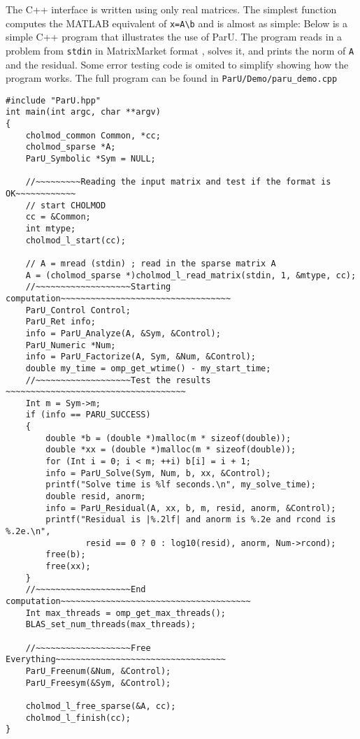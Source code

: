 \documentclass[12pt]{article}
\begin{document}
The C++ interface is written using only real matrices.  
The simplest function computes the MATLAB equivalent of
\verb'x=A\b' and is almost as simple:
Below is a simple C++ program that illustrates the use of ParU.  The
program reads in a problem from \verb'stdin' in MatrixMarket
format \cite{BoisvertPozoRemingtonBarrettDongarra97}, solves it, and prints the
norm of \verb'A' and the residual. 
Some error testing code is omited to simplify showing how the program works. 
The full program can be found in 
\verb'ParU/Demo/paru_demo.cpp'
\begin{verbatim}
#include "ParU.hpp"
int main(int argc, char **argv)
{
    cholmod_common Common, *cc;
    cholmod_sparse *A;
    ParU_Symbolic *Sym = NULL;

    //~~~~~~~~~Reading the input matrix and test if the format is OK~~~~~~~~~~~~
    // start CHOLMOD
    cc = &Common;
    int mtype;
    cholmod_l_start(cc);

    // A = mread (stdin) ; read in the sparse matrix A
    A = (cholmod_sparse *)cholmod_l_read_matrix(stdin, 1, &mtype, cc);
    //~~~~~~~~~~~~~~~~~~~Starting computation~~~~~~~~~~~~~~~~~~~~~~~~~~~~~~~~~~
    ParU_Control Control;
    ParU_Ret info;
    info = ParU_Analyze(A, &Sym, &Control);
    ParU_Numeric *Num;
    info = ParU_Factorize(A, Sym, &Num, &Control);
    double my_time = omp_get_wtime() - my_start_time;
    //~~~~~~~~~~~~~~~~~~~Test the results ~~~~~~~~~~~~~~~~~~~~~~~~~~~~~~~~~~~~
    Int m = Sym->m;
    if (info == PARU_SUCCESS)
    {
        double *b = (double *)malloc(m * sizeof(double));
        double *xx = (double *)malloc(m * sizeof(double));
        for (Int i = 0; i < m; ++i) b[i] = i + 1;
        info = ParU_Solve(Sym, Num, b, xx, &Control);
        printf("Solve time is %lf seconds.\n", my_solve_time);
        double resid, anorm;
        info = ParU_Residual(A, xx, b, m, resid, anorm, &Control);
        printf("Residual is |%.2lf| and anorm is %.2e and rcond is %.2e.\n",
                resid == 0 ? 0 : log10(resid), anorm, Num->rcond);
        free(b);
        free(xx);
    }
    //~~~~~~~~~~~~~~~~~~~End computation~~~~~~~~~~~~~~~~~~~~~~~~~~~~~~~~~~~~~~
    Int max_threads = omp_get_max_threads();
    BLAS_set_num_threads(max_threads);

    //~~~~~~~~~~~~~~~~~~~Free Everything~~~~~~~~~~~~~~~~~~~~~~~~~~~~~~~~~~
    ParU_Freenum(&Num, &Control);
    ParU_Freesym(&Sym, &Control);

    cholmod_l_free_sparse(&A, cc);
    cholmod_l_finish(cc);
}
\end{verbatim}
\end{document}
